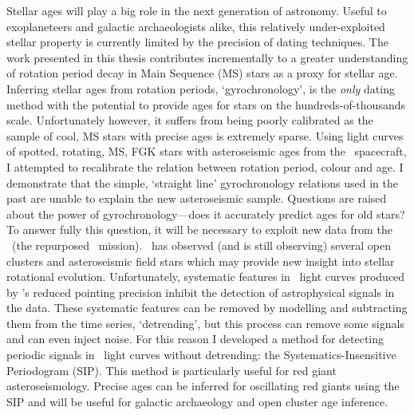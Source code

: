 %
%
%

Stellar ages will play a big role in the next generation of astronomy.
Useful to exoplaneteers and galactic archaeologists alike, this relatively
under-exploited stellar property is currently limited by the precision of
dating techniques.
The work presented in this thesis contributes incrementally to a greater
understanding of rotation period decay in Main Sequence (MS) stars as a proxy
for stellar age.
Inferring stellar ages from rotation periods, `gyrochronology', is the {\it
only} dating method with the potential to provide ages for stars on the
hundreds-of-thousands scale.
Unfortunately however, it suffers from being poorly calibrated as the sample
of cool, MS stars with precise ages is extremely sparse.
Using light curves of spotted, rotating, MS, FGK stars with asteroseismic ages
from the \kepler\ spacecraft, I attempted to recalibrate the relation between
rotation period, colour and age.
I demonstrate that the simple, `straight line' gyrochronology relations used
in the past are unable to explain the new asteroseismic sample.
Questions are raised about the power of gyrochronology---does it accurately
predict ages for old stars?
To answer fully this question, it will be necessary to exploit new data from
the \ktwo\ (the repurposed \kepler\ mission).
\ktwo\ has observed (and is still observing) several open clusters and
asteroseismic field stars which may provide new insight into stellar
rotational evolution.
Unfortunately, systematic features in \ktwo\ light curves produced by
\kepler's reduced pointing precision inhibit the detection of astrophysical
signals in the data.
These systematic features can be removed by modelling and subtracting them
from the time series, `detrending', but this process can remove some signals
and can even inject noise.
For this reason I developed a method for detecting periodic signals in \ktwo\
light curves without detrending: the Systematics-Insensitive Periodogram
(SIP).
This method is particularly useful for red giant asteroseismology.
Precise ages can be inferred for oscillating red giants using the SIP and will
be useful for galactic archaeology and open cluster age inference.
